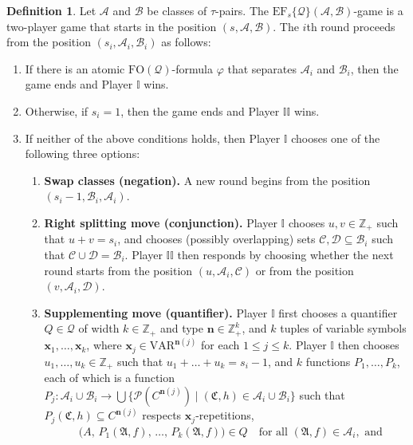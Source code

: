 \documentclass{article}
\theoremstyle{definition}
\newtheorem{definition}[theorem]{Definition}
\begin{document}
\begin{definition}
    Let $\mathcal{A}$ and $\mathcal{B}$ be classes of $\tau$-pairs. The $\mathrm{EF}_{s}\{\mathcal{Q}\}(\mathcal{A},\mathcal{B})$-game is a two-player game that starts in the position $(s,\mathcal{A},\mathcal{B})$. The $i$th round proceeds from the position $(s_i,\mathcal{A}_i,\mathcal{B}_i)$ as follows:
    \begin{enumerate}
        \item If there is an atomic $\mathrm{FO}(\mathcal{Q})$-formula $\varphi$ that separates $\mathcal{A}_i$ and $\mathcal{B}_i$, then the game ends and Player $\mathbb{I}$ wins.
        \item Otherwise, if $s_i=1$, then the game ends and Player $\mathbb{II}$ wins.
        \item If neither of the above conditions holds, then Player $\mathbb{I}$ chooses one of the following three options:
        \begin{enumerate}
            \item \textbf{Swap classes (negation).} A new round begins from the position $(s_i-1,\mathcal{B}_i,\mathcal{A}_i)$.
            \item \textbf{Right splitting move (conjunction).} Player $\mathbb{I}$ chooses $u,v\in \mathbb{Z}_+$ such that $u+v=s_i$, and chooses (possibly overlapping) sets $\mathcal{C},\mathcal{D}\subseteq \mathcal{B}_i$ such that $\mathcal{C}\cup\mathcal{D}=\mathcal{B}_i$. Player $\mathbb{II}$ then responds by choosing whether the next round starts from the position $(u,\mathcal{A}_i,\mathcal{C})$ or from the position $(v,\mathcal{A}_i,\mathcal{D})$.
            \item \textbf{Supplementing move (quantifier).} Player $\mathbb{I}$ first chooses a quantifier $Q \in \mathcal{Q}$ of width $k\in\mathbb{Z}_+$ and type $\textbf{n}\in\mathbb{Z}_+^k$, and $k$ tuples of variable symbols $\textbf{x}_1,\dots,\textbf{x}_k$, where $\textbf{x}_j\in\text{VAR}^{\textbf{n}(j)}$ for each $1 \leq j \leq k$. Player $\mathbb{I}$ then chooses $u_1,\dots,u_k\in\mathbb{Z}_+$ such that $u_1+\dots+u_k=s_i-1$, and $k$ functions $P_1,\dots,P_k$, each of which is a function $P_j:\mathcal{A}_i\cup \mathcal{B}_i\to\bigcup\{\mathcal{P}(C^{\textbf{n}(j)})\mid (\mathfrak{C},h)\in\mathcal{A}_i\cup\mathcal{B}_i\}$ such that $P_j(\mathfrak{C},h)\subseteq C^{\textbf{n}(j)}$ respects $\textbf{x}_j$-repetitions,
            \begin{align*}
                &\big(A,\, P_1(\mathfrak{A},f),\, \ldots,\, P_k(\mathfrak{A},f)\big) \in Q \quad \text{for all } (\mathfrak{A},f) \in \mathcal{A}_i, \text{ and}\\

\end{align*}
\end{enumerate}
\end{enumerate}
\end{definition}
\end{document}
